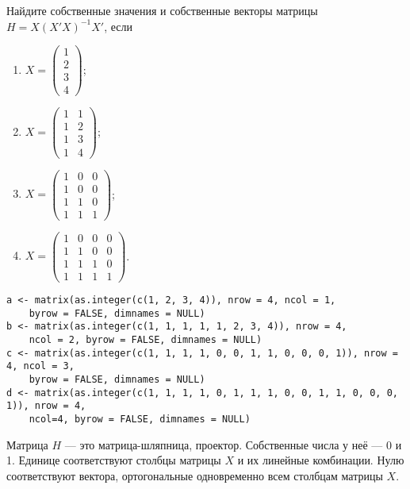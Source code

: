 \begin{problem}
Найдите собственные значения и собственные векторы матрицы $H = X(X'X)^{-1}X'$, если

\begin{enumerate}
\item $X = \begin{pmatrix} 1 \\ 2 \\ 3 \\ 4 \end{pmatrix}$;
\item $X = \begin{pmatrix} 1 & 1 \\ 1 & 2 \\ 1 & 3 \\ 1 & 4 \end{pmatrix}$;
\item $X = \begin{pmatrix} 1 & 0 & 0 \\ 1 & 0 & 0 \\ 1 & 1 & 0  \\ 1 & 1 & 1 \end{pmatrix}$;
\item $X = \begin{pmatrix} 1 & 0 & 0 & 0 \\ 1 & 1 & 0 & 0 \\ 1 & 1 & 1 & 0  \\ 1 & 1 & 1 & 1 \end{pmatrix}$.
\end{enumerate}


\begin{sol}

\begin{verbatim}
a <- matrix(as.integer(c(1, 2, 3, 4)), nrow = 4, ncol = 1,
    byrow = FALSE, dimnames = NULL)
b <- matrix(as.integer(c(1, 1, 1, 1, 1, 2, 3, 4)), nrow = 4, 
    ncol = 2, byrow = FALSE, dimnames = NULL)
c <- matrix(as.integer(c(1, 1, 1, 1, 0, 0, 1, 1, 0, 0, 0, 1)), nrow = 4, ncol = 3, 
    byrow = FALSE, dimnames = NULL)
d <- matrix(as.integer(c(1, 1, 1, 1, 0, 1, 1, 1, 0, 0, 1, 1, 0, 0, 0, 1)), nrow = 4, 
    ncol=4, byrow = FALSE, dimnames = NULL)
\end{verbatim}


Матрица $H$ — это матрица-шляпница, проектор. Собственные числа у неё — 0 и 1. Единице соответствуют столбцы матрицы $X$ и их линейные комбинации. Нулю соответствуют вектора, ортогональные одновременно всем столбцам матрицы $X$.
\end{sol}
\end{problem}


